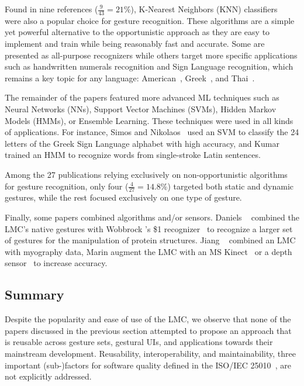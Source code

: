 Found in nine references ($\frac{9}{43}{=}21\%$), K-Nearest Neighbors (KNN) classifiers~\cite{Duda:2000} were also a popular choice for gesture recognition. These algorithms are a simple yet powerful alternative to the opportunistic approach as they are easy to implement and train while being reasonably fast and accurate. Some are presented as all-purpose recognizers \cite{Caputo:2017,Taranta:2017} while others target more specific applications such as handwritten numerals recognition \cite{Chiang:2017} and Sign Language recognition, which remains a key topic for any language: American~\cite{Ferreira:2019,Kumar:2017b,Mapari:2016,Schioppo:2019}, Greek~\cite{Simos:2016}, and Thai~\cite{Thaweesitthichat:2018}.

The remainder of the papers featured more advanced ML techniques such as Neural Networks (NNs), Support Vector Machines (SVMs), Hidden Markov Models (HMMs), or Ensemble Learning. These techniques were used in all kinds of applications. For instance, Simos and Nikolaos~\cite{Simos:2016} used an SVM to classify the 24 letters of the Greek Sign Language alphabet with high accuracy, and Kumar \etal~\cite{Kumar:2017a} trained an HMM to recognize words from single-stroke Latin sentences.

Among the 27 publications relying exclusively on non-opportunistic algorithms for gesture recognition, only four ($\frac{4}{27}{=}14.8\%$) targeted both static and dynamic gestures, while the rest focused exclusively on one type of gesture.

Finally, some papers combined algorithms and/or sensors. Daniels \etal~\cite{Daniels:2014} combined the LMC's native gestures with Wobbrock \etal's \$1 recognizer~\cite{Wobbrock:2007} to recognize a larger set of gestures for the manipulation of protein structures. Jiang \etal~\cite{Jiang:2018} combined an LMC with myography data, Marin \etal augment the LMC with an MS Kinect~\cite{Marin:2014} or a depth sensor~\cite{Marin:2016} to increase accuracy. 

\subsection{Summary} \label{sec:state_of_the_art:lmc:summary}
Despite the popularity and ease of use of the LMC, we observe that none of the papers discussed in the previous section attempted to propose an approach that is reusable across gesture sets, gestural UIs, and applications towards their mainstream development. Reusability, interoperability, and maintainability, three important (sub-)factors for software quality defined in the ISO/IEC 25010~\cite{iso25010}, are not explicitly addressed.


